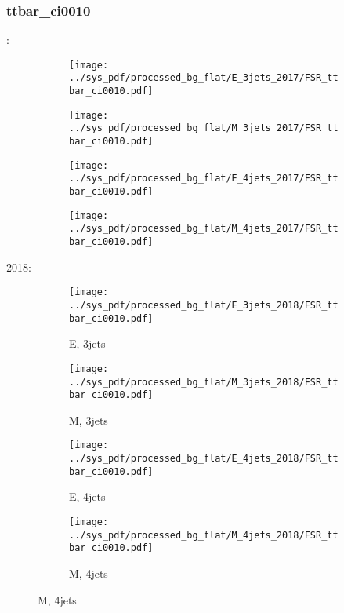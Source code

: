 \documentclass{beamer}
\begin{document}
\begin{frame}
\frametitle{ttbar_ci0010}
\fontsize{5}{1}:
\begin{figure}
\centering
\begin{subfigure}[b]{0.24\textwidth}
\texttt{[image: ../sys\_pdf/processed\_bg\_flat/E\_3jets\_2017/FSR\_ttbar\_ci0010.pdf]}
\end{subfigure}
\begin{subfigure}[b]{0.24\textwidth}
\texttt{[image: ../sys\_pdf/processed\_bg\_flat/M\_3jets\_2017/FSR\_ttbar\_ci0010.pdf]}
\end{subfigure}
\begin{subfigure}[b]{0.24\textwidth}
\texttt{[image: ../sys\_pdf/processed\_bg\_flat/E\_4jets\_2017/FSR\_ttbar\_ci0010.pdf]}
\end{subfigure}
\begin{subfigure}[b]{0.24\textwidth}
\texttt{[image: ../sys\_pdf/processed\_bg\_flat/M\_4jets\_2017/FSR\_ttbar\_ci0010.pdf]}
\end{subfigure}
\end{figure}
2018:
\begin{figure}
\centering
\begin{subfigure}[b]{0.24\textwidth}
\texttt{[image: ../sys\_pdf/processed\_bg\_flat/E\_3jets\_2018/FSR\_ttbar\_ci0010.pdf]}
\captionsetup{font=tiny}
\caption{E, 3jets}
\end{subfigure}
\begin{subfigure}[b]{0.24\textwidth}
\texttt{[image: ../sys\_pdf/processed\_bg\_flat/M\_3jets\_2018/FSR\_ttbar\_ci0010.pdf]}
\captionsetup{font=tiny}
\caption{M, 3jets}
\end{subfigure}
\begin{subfigure}[b]{0.24\textwidth}
\texttt{[image: ../sys\_pdf/processed\_bg\_flat/E\_4jets\_2018/FSR\_ttbar\_ci0010.pdf]}
\captionsetup{font=tiny}
\caption{E, 4jets}
\end{subfigure}
\begin{subfigure}[b]{0.24\textwidth}
\texttt{[image: ../sys\_pdf/processed\_bg\_flat/M\_4jets\_2018/FSR\_ttbar\_ci0010.pdf]}
\captionsetup{font=tiny}
\caption{M, 4jets}
\end{subfigure}
\end{figure}
\end{frame}
\end{document}
